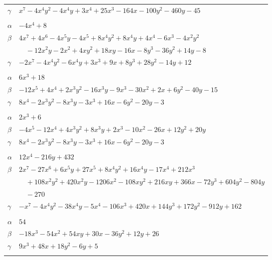 \documentclass[11pt]{article}
\begin{document}
\begin{longtable}{@{}ll@{}}
$\gamma$ & $x^{7}-4x^{4}y^{2}-4x^{4}y+3x^{4}+25x^{3}-164x-100y^{2}-460y-45$\\
\addlinespace[3pt]
\multicolumn{2}{@{}l}{$\{i,j\}=\{10,29\}$, $k_{ij}=2^{4}$}\\
$\alpha$ & $-4x^{4}+8$\\
$\beta$ & $4x^{7}+4x^{6}-4x^{5}y-4x^{5}+8x^{4}y^{2}+8x^{4}y+4x^{4}-6x^{3}-4x^{2}y^{2}$\\
 & $\quad -12x^{2}y-2x^{2}+4xy^{2}+18xy-16x-8y^{3}-36y^{2}+14y-8$\\
$\gamma$ & $-2x^{7}-4x^{4}y^{2}-6x^{4}y+3x^{3}+9x+8y^{3}+28y^{2}-14y+12$\\
\addlinespace[3pt]
\multicolumn{2}{@{}l}{$\{i,j\}=\{11,17\}$, $k_{ij}=2^{2}\cdot 3^{2}$}\\
$\alpha$ & $6x^{3}+18$\\
$\beta$ & $-12x^{5}+4x^{4}+2x^{3}y^{2}-16x^{3}y-9x^{3}-30x^{2}+2x+6y^{2}-40y-15$\\
$\gamma$ & $8x^{4}-2x^{3}y^{2}-8x^{3}y-3x^{3}+16x-6y^{2}-20y-3$\\
\addlinespace[3pt]
\multicolumn{2}{@{}l}{$\{i,j\}=\{11,24\}$, $k_{ij}=2^{2}\cdot 3$}\\
$\alpha$ & $2x^{3}+6$\\
$\beta$ & $-4x^{5}-12x^{4}+4x^{3}y^{2}+8x^{3}y+2x^{3}-10x^{2}-26x+12y^{2}+20y$\\
$\gamma$ & $8x^{4}-2x^{3}y^{2}-8x^{3}y-3x^{3}+16x-6y^{2}-20y-3$\\
\addlinespace[3pt]
\multicolumn{2}{@{}l}{$\{i,j\}=\{11,30\}$, $k_{ij}=2^{5}\cdot 3^{3}$}\\
$\alpha$ & $12x^{4}-216y+432$\\
$\beta$ & $2x^{7}-27x^{6}+6x^{5}y+27x^{5}+8x^{4}y^{2}+16x^{4}y-17x^{4}+212x^{3}$\\
 & $\quad +108x^{2}y^{2}+420x^{2}y-1206x^{2}-108xy^{2}+216xy+366x-72y^{3}+604y^{2}-804y$\\
 & $\quad -270$\\
$\gamma$ & $-x^{7}-4x^{4}y^{2}-38x^{4}y-5x^{4}-106x^{3}+420x+144y^{3}+172y^{2}-912y+162$\\
\addlinespace[3pt]
\multicolumn{2}{@{}l}{$\{i,j\}=\{12,27\}$, $k_{ij}=2\cdot 7^{2}$}\\
$\alpha$ & $54$\\
$\beta$ & $-18x^{3}-54x^{2}+54xy+30x-36y^{2}+12y+26$\\
$\gamma$ & $9x^{3}+48x+18y^{2}-6y+5$\\
\addlinespace[3pt]
\multicolumn{2}{@{}l}{$\{i,j\}=\{13,20\}$, $k_{ij}=3^{3}\cdot 7$}\\

\end{longtable}
\end{document}
